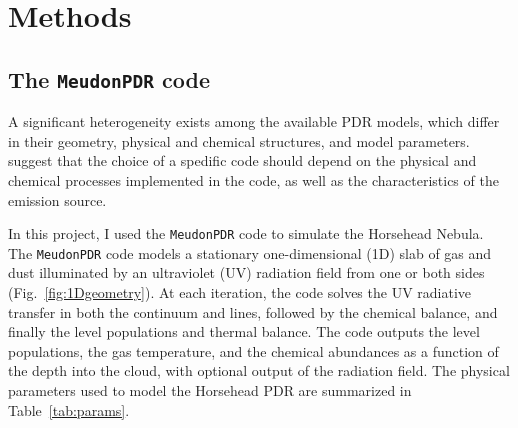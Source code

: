 \documentclass[12pt,a4paper]{article}
\newcommand{\mdpdr}{\texttt{MeudonPDR} code}
\begin{document}


\section{Methods}
\subsection{The \mdpdr{}}
A significant heterogeneity exists among the available PDR models, which differ in their geometry, physical and chemical structures, and model parameters. \textcite{Röllig2007} suggest that the choice of a spedific code should depend on the physical and chemical processes implemented in the code, as well as the characteristics of the emission source. 

In this project, I used the \mdpdr{} \parencite{LePetit2006,Goicoechea2007,Gonzalez2008,LeBourlot2012,Bron_thesis,Bron2014,Bron2016} to simulate the Horsehead Nebula. The \mdpdr{} models a stationary one-dimensional (1D) slab of gas and dust illuminated by an ultraviolet (UV) radiation field from one or both sides (Fig.~\ref{fig:1Dgeometry}). At each iteration, the code solves the UV radiative transfer in both the continuum and lines, followed by the chemical balance, and finally the level populations and thermal balance. The code outputs the level populations, the gas temperature, and the chemical abundances as a function of the depth into the cloud, with optional output of the radiation field. The physical parameters used to model the Horsehead PDR are summarized in Table~\ref{tab:params}.
\end{document}
